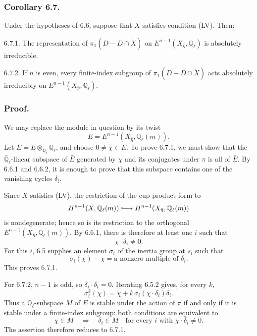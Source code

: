 \subsubsection*{Corollary 6.7.}
Under the hypotheses of 6.6, suppose that $X$ satisfies condition
(LV).  Then:

\medskip
\noindent
\textup{6.7.1.} The representation of
$\pi_1(D-D\cap\check X)$ on
$E^{n-1}(X_{\bar\eta},\mathbb Q_\ell)$ is absolutely irreducible.

\medskip
\noindent
\textup{6.7.2.} If $n$ is even, every finite-index subgroup of
$\pi_1(D-D\cap\check X)$ acts absolutely irreducibly on
$E^{n-1}(X_{\bar\eta},\mathbb Q_\ell)$.

\subsubsection*{Proof.}
We may replace the module in question by its twist
\[
E=E^{n-1}(X_{\bar\eta},\mathbb Q_\ell(m)).
\]
Let
$\bar E=E\otimes_{\mathbb Q_\ell}\bar{\mathbb Q}_\ell$, and choose
$0\ne\chi\in\bar E$.  To prove 6.7.1, we must show that the
$\bar{\mathbb Q}_\ell$-linear subspace of $\bar E$ generated by $\chi$
and its conjugates under $\pi$ is all of $\bar E$.  By 6.6.1 and 6.6.2,
it is enough to prove that this subspace contains one of the vanishing
cycles $\delta_i$.

Since $X$ satisfies (LV), the restriction of the cup-product form to
\[
H^{n-1}(X,\mathbb Q_\ell(m))
\lhook\joinrel\longrightarrow
H^{n-1}(X_{\bar\eta},\mathbb Q_\ell(m))
\]
is nondegenerate; hence so is its restriction to the orthogonal
$E^{n-1}(X_{\bar\eta},\mathbb Q_\ell(m))$.  By 6.6.1, there is therefore
at least one $i$ such that
\[
\chi\cdot\delta_i\ne0.
\]
For this $i$, 6.5 supplies an element $\sigma_i$ of the inertia group at
$s_i$ such that
\begin{equation}\tag{6.7.3}
\sigma_i(\chi)-\chi
=\text{a nonzero multiple of }\delta_i.
\end{equation}
This proves 6.7.1.

For 6.7.2, $n-1$ is odd, so $\delta_i\cdot\delta_i=0$.  Iterating
6.5.2 gives, for every $k$,
\begin{equation}\tag{6.7.4}
\sigma_i^k(\chi)
=\chi+k\,\sigma_i(\chi\cdot\delta_i)\delta_i.
\end{equation}
Thus a $\mathbb Q_\ell$-subspace $M$ of $E$ is stable under the action
of $\pi$ if and only if it is stable under a finite-index subgroup:
both conditions are equivalent to
\[
\chi\in M
\quad\Longrightarrow\quad
\delta_i\in M\quad\text{for every $i$ with }
\chi\cdot\delta_i\ne0.
\]
The assertion therefore reduces to 6.7.1.

